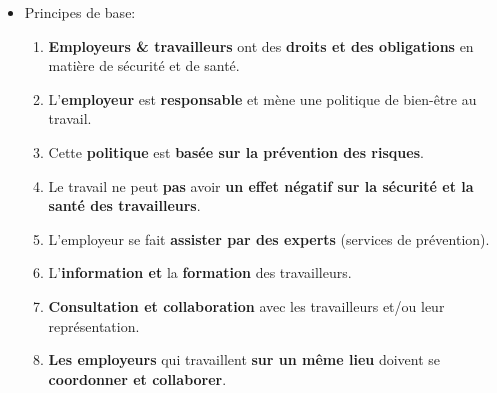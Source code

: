 \documentclass[a4paper]{article}
\begin{document}
\begin{itemize}
\item Principes de base:
\begin{enumerate}
    \item \textbf{Employeurs \& travailleurs} ont des \textbf{droits et des obligations} en matière de sécurité et de santé.
    \item L’\textbf{employeur} est \textbf{responsable} et mène une politique de bien-être au travail.
    \item Cette \textbf{politique} est \textbf{basée sur la prévention des risques}.
    \item Le travail ne peut \textbf{pas} avoir \textbf{un effet négatif sur la sécurité et la santé des travailleurs}.
    \item L’employeur se fait \textbf{assister par des experts} (services de prévention).
    \item L’\textbf{information et} la \textbf{formation} des travailleurs.
    \item \textbf{Consultation et collaboration} avec les travailleurs et/ou leur représentation.
    \item \textbf{Les employeurs} qui travaillent \textbf{sur un même lieu} doivent se \textbf{coordonner et collaborer}.
\end{enumerate}






\end{itemize}
\end{document}
